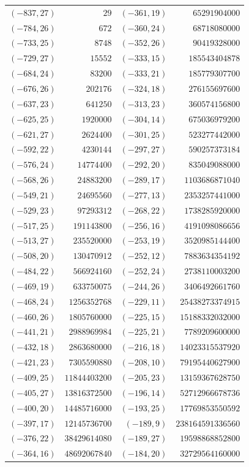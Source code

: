 {\scriptsize\begin{tabular}{@{}r@{\ \ }r@{\qquad}r@{\ \ }r@{}}
$(-837,27)$ & $29$ & $(-361,19)$ & $65291904000$ \\
$(-784,26)$ & $672$ & $(-360,24)$ & $68718080000$ \\
$(-733,25)$ & $8748$ & $(-352,26)$ & $90419328000$ \\
$(-729,27)$ & $15552$ & $(-333,15)$ & $185543404878$ \\
$(-684,24)$ & $83200$ & $(-333,21)$ & $185779307700$ \\
$(-676,26)$ & $202176$ & $(-324,18)$ & $276155697600$ \\
$(-637,23)$ & $641250$ & $(-313,23)$ & $360574156800$ \\
$(-625,25)$ & $1920000$ & $(-304,14)$ & $675036979200$ \\
$(-621,27)$ & $2624400$ & $(-301,25)$ & $523277442000$ \\
$(-592,22)$ & $4230144$ & $(-297,27)$ & $590257373184$ \\
$(-576,24)$ & $14774400$ & $(-292,20)$ & $835049088000$ \\
$(-568,26)$ & $24883200$ & $(-289,17)$ & $1103686871040$ \\
$(-549,21)$ & $24695560$ & $(-277,13)$ & $2353257441000$ \\
$(-529,23)$ & $97293312$ & $(-268,22)$ & $1738285920000$ \\
$(-517,25)$ & $191143800$ & $(-256,16)$ & $4191098086656$ \\
$(-513,27)$ & $235520000$ & $(-253,19)$ & $3520985144400$ \\
$(-508,20)$ & $130470912$ & $(-252,12)$ & $7883634354192$ \\
$(-484,22)$ & $566924160$ & $(-252,24)$ & $2738110003200$ \\
$(-469,19)$ & $633750075$ & $(-244,26)$ & $3406492661760$ \\
$(-468,24)$ & $1256352768$ & $(-229,11)$ & $25438273374915$ \\
$(-460,26)$ & $1805760000$ & $(-225,15)$ & $15188332032000$ \\
$(-441,21)$ & $2988969984$ & $(-225,21)$ & $7789209600000$ \\
$(-432,18)$ & $2863680000$ & $(-216,18)$ & $14023315537920$ \\
$(-421,23)$ & $7305590880$ & $(-208,10)$ & $79195440627900$ \\
$(-409,25)$ & $11844403200$ & $(-205,23)$ & $13159367628750$ \\
$(-405,27)$ & $13816372500$ & $(-196,14)$ & $52712966678736$ \\
$(-400,20)$ & $14485716000$ & $(-193,25)$ & $17769853550592$ \\
$(-397,17)$ & $12145736700$ & $(-189,9)$ & $238164591336560$ \\
$(-376,22)$ & $38429614080$ & $(-189,27)$ & $19598868852800$ \\
$(-364,16)$ & $48692067840$ & $(-184,20)$ & $32729564160000$ \\
\end{tabular}}\par
